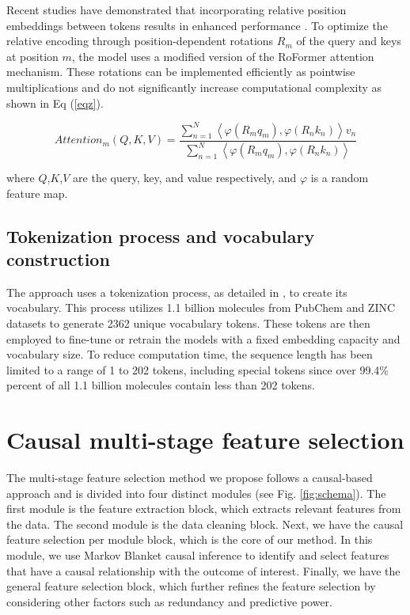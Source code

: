 \documentclass{article}
\begin{document}
Recent studies have demonstrated that incorporating relative position embeddings between tokens results in enhanced performance \cite{liu2023molrope}. To optimize the relative encoding through position-dependent rotations $R_m$ of the query and keys at position $m$, the model uses a modified version of the RoFormer \cite{su2021roformer} attention mechanism. These rotations can be implemented efficiently as pointwise multiplications and do not significantly increase computational complexity as shown in Eq (\ref{eqz}).

\begin{equation}
Attention_m (Q,K,V)=  \frac{\sum_{n=1}^{N} \left \langle \varphi (R_mq_m), \varphi (R_nk_n)  \right \rangle v_n}{\sum_{n=1}^{N} \left \langle \varphi (R_mq_m), \varphi (R_nk_n)  \right \rangle}
\label{eqz}
\end{equation}

where $Q$,$K$,$V$ are the query, key, and value respectively, and $\varphi$ is a random feature map.

\subsection{Tokenization process and vocabulary construction}
\label{tokenization}


The approach uses a tokenization process, as detailed in \cite{schwaller2019molecular}, to create its vocabulary. This process utilizes 1.1 billion molecules from PubChem and ZINC datasets to generate 2362 unique vocabulary tokens. These tokens are then employed to fine-tune or retrain the models with a fixed embedding capacity and vocabulary size. To reduce computation time, the sequence length has been limited to a range of 1 to 202 tokens, including special tokens since over 99.4\% percent of all 1.1 billion molecules contain less than 202 tokens.


\section{Causal multi-stage feature selection}
\label{Causal}

The multi-stage feature selection method we propose follows a causal-based approach and is divided into four distinct modules (see Fig. \ref{fig:schema}). The first module is the feature extraction block, which extracts relevant features from the data. The second module is the data cleaning block.
Next, we have the causal feature selection per module block, which is the core of our method. In this module, we use Markov Blanket causal inference to identify and select features that have a causal relationship with the outcome of interest.
Finally, we have the general feature selection block, which further refines the feature selection by considering other factors such as redundancy and predictive power.
\end{document}
